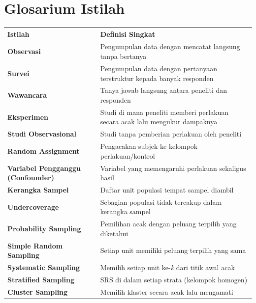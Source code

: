 \documentclass[
  indonesian,
  letterpaper,
]{book}
\newcounter{none} %
\begin{document}
\section{Glosarium Istilah}\label{glosarium-istilah-2}

{\def\LTcaptype{none} %
\begin{longtable}[]{@{}
  >{\raggedright\arraybackslash}p{}
  >{\raggedright\arraybackslash}p{}@{}}
\toprule\noalign{}
\begin{minipage}[b]{\linewidth}\raggedright
Istilah
\end{minipage} & \begin{minipage}[b]{\linewidth}\raggedright
Definisi Singkat
\end{minipage} \\
\midrule\noalign{}
\endhead
\bottomrule\noalign{}
\endlastfoot
\textbf{Observasi} & Pengumpulan data dengan mencatat langsung tanpa
bertanya \\
\textbf{Survei} & Pengumpulan data dengan pertanyaan terstruktur kepada
banyak responden \\
\textbf{Wawancara} & Tanya jawab langsung antara peneliti dan
responden \\
\textbf{Eksperimen} & Studi di mana peneliti memberi perlakuan secara
acak lalu mengukur dampaknya \\
\textbf{Studi Observasional} & Studi tanpa pemberian perlakuan oleh
peneliti \\
\textbf{Random Assignment} & Pengacakan subjek ke kelompok
perlakuan/kontrol \\
\textbf{Variabel Pengganggu (Confounder)} & Variabel yang memengaruhi
perlakuan sekaligus hasil \\
\textbf{Kerangka Sampel} & Daftar unit populasi tempat sampel diambil \\
\textbf{Undercoverage} & Sebagian populasi tidak tercakup dalam kerangka
sampel \\
\textbf{Probability Sampling} & Pemilihan acak dengan peluang terpilih
yang diketahui \\
\textbf{Simple Random Sampling} & Setiap unit memiliki peluang terpilih
yang sama \\
\textbf{Systematic Sampling} & Memilih setiap unit ke-\emph{k} dari
titik awal acak \\
\textbf{Stratified Sampling} & SRS di dalam setiap strata (kelompok
homogen) \\
\textbf{Cluster Sampling} & Memilih klaster secara acak lalu mengamati

\end{longtable}}
\end{document}
